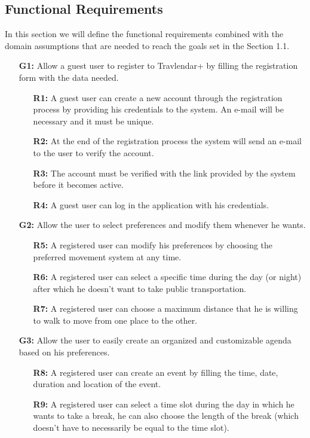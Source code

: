 \documentclass{article}
\begin{document}
\subsection{Functional Requirements}
In this section we will define the functional requirements combined with the domain assumptions that are needed to reach the goals set in the Section 1.1.
\begin{enumerate}
\item[\textbf{G1:}] Allow a guest user to register to Travlendar+ by filling the registration form with the data needed.
\begin{enumerate}
\item[\textbf{R1:}] A guest user can create a new account through the registration process by providing his credentials to the system. An e-mail will be necessary and it must be unique.
\item[\textbf{R2:}] At the end of the registration process the system will send an e-mail to the user to verify the account.
\item[\textbf{R3:}] The account must be verified with the link provided by the system before it becomes active.
\item[\textbf{R4:}] A guest user can log in the application with his credentials.
\end{enumerate}
\item[\textbf{G2:}] Allow the user to select preferences and modify them whenever he wants.
\begin{enumerate}
\item[\textbf{R5:}] A registered user can modify his preferences by choosing the preferred movement system at any time.
\item[\textbf{R6:}] A registered user can select a specific time during the day (or night) after which he doesn't want to take public transportation.
\item[\textbf{R7:}] A registered user can choose a maximum distance that he is willing to walk to move from one place to the other.
\end{enumerate}
\item[\textbf{G3:}] Allow the user to easily create an organized and customizable agenda based on his preferences.
\begin{enumerate}
\item[\textbf{R8:}] A registered user can create an event by filling the time, date, duration and location of the event.
\item[\textbf{R9:}] A registered user can select a time slot during the day in which he wants to take a break, he can also choose the length of the break (which doesn't have to necessarily be equal to the time slot).

\end{enumerate}
\end{enumerate}
\end{document}
